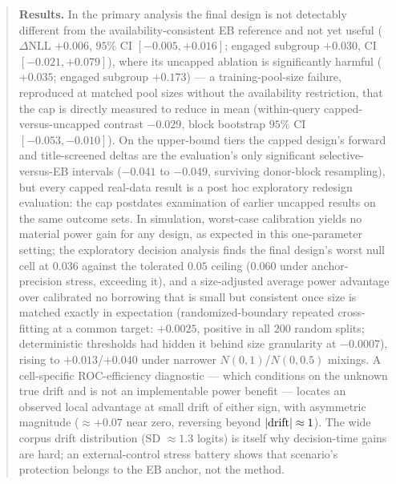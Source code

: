 \documentclass[11pt]{article}
\begin{document}
\begin{abstract}
\noindent\textbf{Results.} In the primary analysis the final design is
not detectably different from the availability-consistent EB reference
and not yet useful ($\Delta$NLL $+0.006$, $95\%$ CI
$[-0.005,+0.016]$; engaged subgroup $+0.030$, CI $[-0.021,+0.079]$),
where its uncapped ablation is significantly harmful ($+0.035$; engaged
subgroup $+0.173$) --- a training-pool-size failure, reproduced at
matched pool sizes without the availability restriction, that the cap is
directly measured to reduce in mean (within-query capped-versus-uncapped
contrast $-0.029$, block bootstrap $95\%$ CI $[-0.053,-0.010]$). On the upper-bound tiers the capped design's
forward and title-screened deltas are the evaluation's only significant
selective-versus-EB intervals ($-0.041$ to $-0.049$, surviving
donor-block resampling), but every capped real-data result is a post hoc
exploratory redesign evaluation: the cap postdates examination of earlier
uncapped results on the same outcome sets. In simulation, worst-case
calibration yields no material power gain for any design, as expected in
this one-parameter setting; the exploratory decision analysis finds the
final design's worst null cell at $0.036$ against the tolerated $0.05$
ceiling ($0.060$ under anchor-precision stress, exceeding it), and a
size-adjusted average power advantage over calibrated no borrowing that
is small but consistent once size is matched exactly in expectation
(randomized-boundary repeated cross-fitting at a common target:
$+0.0025$, positive in all $200$ random splits; deterministic
thresholds had hidden it behind size granularity at $-0.0007$), rising
to $+0.013$/$+0.040$ under narrower $N(0,1)$/$N(0,0.5)$ mixings. A cell-specific ROC-efficiency
diagnostic --- which conditions on the unknown true drift and is not an
implementable power benefit --- locates an observed local advantage at
small drift of either sign, with asymmetric magnitude ($\approx +0.07$
near zero, reversing beyond $|{\rm drift}| \approx 1$). The wide corpus
drift distribution (SD $\approx 1.3$ logits) is itself why decision-time
gains are hard; an external-control stress battery shows that scenario's
protection belongs to the EB anchor, not the method.


\end{abstract}
\end{document}

